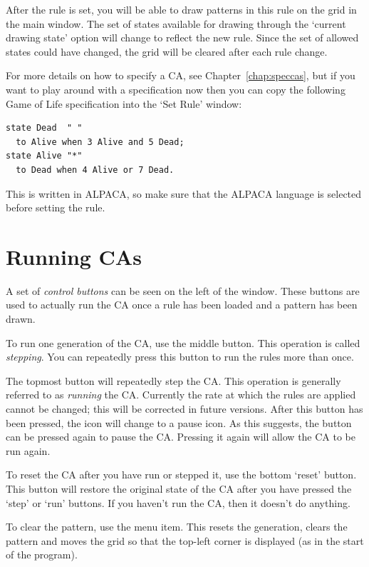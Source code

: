 \documentclass[oneside,a4paper]{memoir}
\begin{document}
After the rule is set, you will be able to draw patterns in this rule on the grid in the main window.
The set of states available for drawing through the `current drawing state' option will change to reflect the new rule.
Since the set of allowed states could have changed, the grid will be cleared after each rule change.

For more details on how to specify a CA, see Chapter~\ref{chap:speccas},
  but if you want to play around with a specification now then you can copy the following Game of Life specification into the `Set Rule' window:

\begin{verbatim}
state Dead  " "
  to Alive when 3 Alive and 5 Dead;
state Alive "*"
  to Dead when 4 Alive or 7 Dead.
\end{verbatim}

This is written in ALPACA, so make sure that the ALPACA language is selected before setting the rule.

\section{Running CAs}
\label{sec:running}

A set of \emph{control buttons} can be seen on the left of the window.
These buttons are used to actually run the CA once a rule has been loaded and a pattern has been drawn.

To run one generation of the CA, use the middle button.
This operation is called \emph{stepping}.
You can repeatedly press this button to run the rules more than once.

The topmost button will repeatedly step the CA.
This operation is generally referred to as \emph{running} the CA.
Currently the rate at which the rules are applied cannot be changed;
  this will be corrected in future versions.
After this button has been pressed, the icon will change to a pause icon.
As this suggests, the button can be pressed again to pause the CA.
Pressing it again will allow the CA to be run again.

To reset the CA after you have run or stepped it, use the bottom `reset' button.
This button will restore the original state of the CA after you have pressed the `step' or `run' buttons.
If you haven't run the CA, then it doesn't do anything.

To clear the pattern, use the  menu item.
This resets the generation, clears the pattern and moves the grid so that the top-left corner is displayed
  (as in the start of the program).
\end{document}
